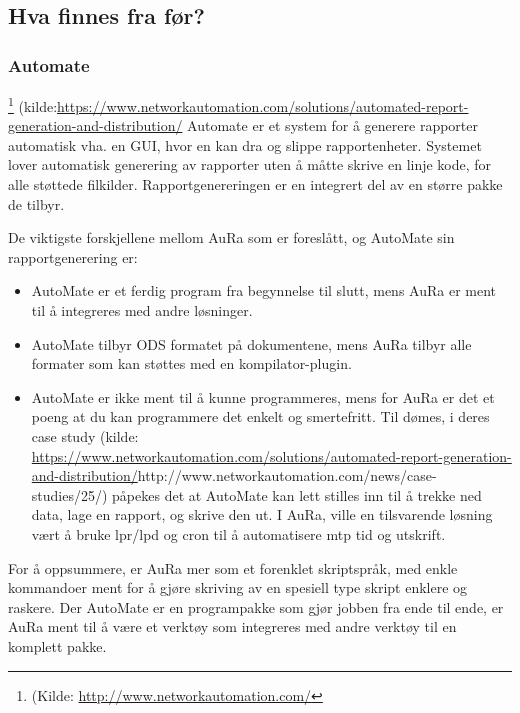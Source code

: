 \documentclass[norsk, 11pt, a4paper]{article}
\begin{document}
\subsection{Hva finnes fra før?}



\subsubsection{Automate}
\footnote{(Kilde: \href{http://www.networkautomation.com/}{http://www.networkautomation.com/}}
(kilde:\href{https://www.networkautomation.com/solutions/automated-report-generation-and-distribution/}{https://www.networkautomation.com/solutions/automated-report-generation-and-distribution/}
Automate er et system for å generere rapporter automatisk vha. en GUI, hvor en kan dra og slippe rapportenheter. Systemet lover automatisk generering av rapporter uten å måtte skrive en linje kode, for alle støttede filkilder. Rapportgenereringen er en integrert del av en større pakke de tilbyr.



De viktigste forskjellene mellom AuRa som er foreslått, og AutoMate sin rapportgenerering er:




\begin{itemize}
\item AutoMate er et ferdig program fra begynnelse til slutt, mens AuRa er ment til å integreres med andre løsninger.
\item AutoMate tilbyr ODS formatet på dokumentene, mens AuRa tilbyr alle formater som kan støttes med en kompilator-plugin.
\item AutoMate er ikke ment til å kunne programmeres, mens for AuRa er det et poeng at du kan programmere det enkelt og smertefritt. Til dømes, i deres case study (kilde: \href{https://www.networkautomation.com/solutions/automated-report-generation-and-distribution/}{https://www.networkautomation.com/solutions/automated-report-generation-and-distribution/}http://www.networkautomation.com/news/case-studies/25/) påpekes det at AutoMate kan lett stilles inn til å trekke ned data, lage en rapport, og skrive den ut. I AuRa, ville en tilsvarende løsning vært å bruke lpr/lpd og cron til å automatisere mtp tid og utskrift.
\end{itemize}




For å oppsummere, er AuRa mer som et forenklet skriptspråk, med enkle kommandoer ment for å gjøre skriving av en spesiell type skript enklere og raskere. Der AutoMate er en programpakke som gjør jobben fra ende til ende, er AuRa ment til å være et verktøy som integreres med andre verktøy til en komplett pakke.
\end{document}
